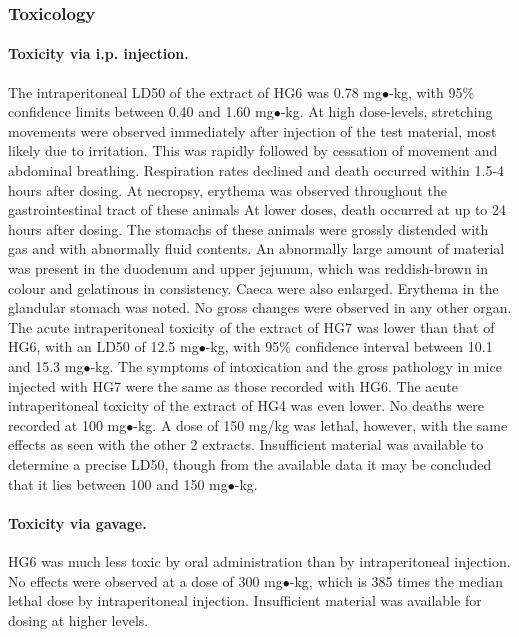 \documentclass[12pt]{article}
\begin{document}

\subsubsection{Toxicology}

\paragraph{Toxicity via i.p. injection.}
The intraperitoneal LD50 of the extract of HG6 was 0.78 mg$\bullet$-kg, with 95\% confidence limits between 0.40 and 1.60 mg$\bullet$-kg. 
At high dose-levels, stretching movements were observed immediately after injection of the test material, most likely due to irritation. 
This was rapidly followed by cessation of movement and abdominal breathing. 
Respiration rates declined and death occurred within 1.5-4 hours after dosing. 
At necropsy, erythema was observed throughout the gastrointestinal tract of these animals At lower doses, death occurred at up to 24 hours after dosing. The stomachs of these animals were grossly distended with gas and with abnormally fluid contents. An abnormally large amount of material was present in the duodenum and upper jejunum, which was reddish-brown in colour and gelatinous in consistency. Caeca were also enlarged. Erythema in the glandular stomach was noted. No gross changes were observed in any other organ. 
The acute intraperitoneal toxicity of the extract of HG7 was lower than that of HG6, with an LD50 of 12.5 mg$\bullet$-kg, with 95\% confidence interval between 10.1 and 15.3 mg$\bullet$-kg. The symptoms of intoxication and the gross pathology in mice injected with HG7 were the same as those recorded with HG6. 
The acute intraperitoneal toxicity of the extract of HG4 was even lower. 
No deaths were recorded at 100 mg$\bullet$-kg. 
A dose of 150 mg/kg was lethal, however, with the same effects as seen with the other 2 extracts. 
Insufficient material was available to determine a precise LD50, though from the available data it may be concluded that it lies between 100 and 150 mg$\bullet$-kg.

\paragraph{Toxicity via gavage.}
 HG6 was much less toxic by oral administration than by intraperitoneal injection. 
 No effects were observed at a dose of 300 mg$\bullet$-kg, which is 385 times the median lethal dose by intraperitoneal injection. 
 Insufficient material was available for dosing at higher levels.​
\end{document}
